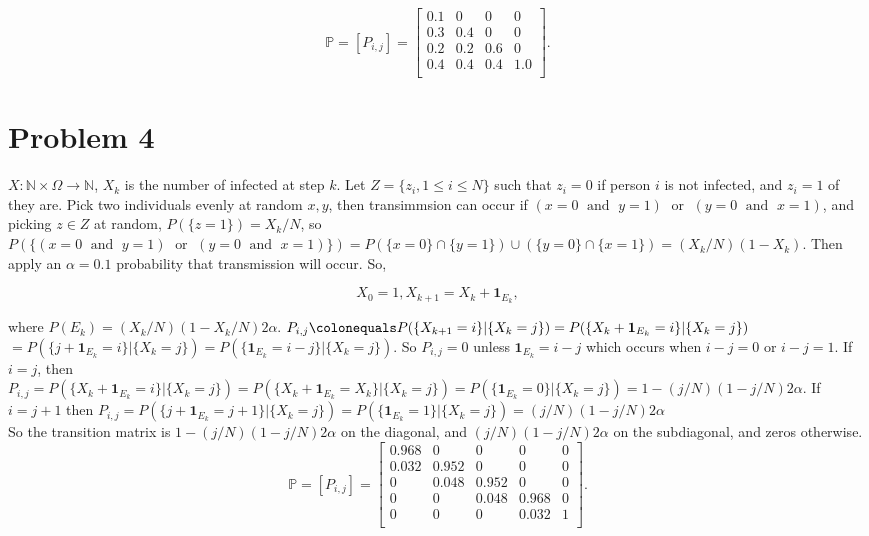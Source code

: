 \documentclass[12pt]{article}
\newcommand{\nats}[0] { \mathbb{N}}
\newcommand{\Om}[0] { \Omega }
\newcommand{\AND}[0]{ \; \textrm{ and } \;  }
\newcommand{\OR}[0]{ \; \textrm{ or } \; }
\newcommand{\rarw}[0] { \rightarrow }
\newcommand{ \defeq }[0] { \colonequals }
\newcommand{ \cf }[1] { \mathbf{1}_{#1} }
\begin{document}
$$
\mathbb{P} = [P_{i,j}] = \left[ \begin{array}{cccc} 
0.1  & 0  & 0 & 0 \\
0.3 & 0.4 & 0  & 0  \\
0.2 & 0.2 & 0.6 & 0 \\
0.4 & 0.4 & 0.4 & 1.0    \\
\end{array} \right].
$$



\section*{Problem 4}

$X: \nats \times \Om \rarw \nats$, $X_k$ is the number of infected at step $k$. Let $Z = \{ z_i, 1 \le i \le N \}$ such that $z_i = 0$ if person $i$ is not infected, and $z_i = 1$ of they are. Pick two individuals evenly at random $x, y$, then transimmsion can occur if $(x = 0 \AND y = 1 ) \OR ( y = 0 \AND x = 1)$, and picking $z \in Z$ at random, $P( \{ z = 1\} ) = X_k/N$, so $P(\{ (x = 0 \AND y = 1 ) \OR ( y = 0 \AND x = 1) \}) = P(  \{ x = 0 \} \cap \{ y = 1 \} ) \cup ( \{ y = 0  \} \cap \{ x = 1 \} )  = (X_k/N)(1-X_k)$. Then apply an $ \alpha = 0.1$ probability that transmission will occur. So,

$$
X_0 = 1, X_{k+1} = X_k + \cf{E_k} ,
$$

\noindent
where $P(E_k) =  (X_k/N) (1-X_k/N) 2 \alpha $. $P_{i,j} \defeq P( \{ X_{k+1} = i\} | \{ X_k = j \} ) = P( \{  X_k + \cf{E_k} = i\} | \{ X_k = j \} )$ $ = P( \{  j + \cf{E_k} = i\} | \{ X_k = j \} ) = P( \{  \cf{E_k} = i - j \} | \{ X_k = j \} )$.  So $P_{i,j} = 0$ unless $\cf{E_k} = i-j$ which occurs when $i-j = 0$ or $i-j = 1$.   If $i = j$, then $P_{i,j} = P( \{  X_k + \cf{E_k} = i\} | \{ X_k = j \} ) = P( \{  X_k + \cf{E_k} = X_k\} | \{ X_k = j \} ) =  P( \{ \cf{E_k} = 0\} | \{ X_k = j \} )  = 1- (j/N) (1-j/N) 2 \alpha $. If $i = j+1$ then $P_{i,j} =  P( \{  j + \cf{E_k} = j+1\} | \{ X_k = j \} ) = P( \{ \cf{E_k} = 1\} | \{ X_k = j \} ) = (j/N) (1-j/N) 2 \alpha $ \\

So the transition matrix is $1- (j/N) (1-j/N) 2 \alpha$ on the diagonal, and $ (j/N) (1-j/N) 2 \alpha$ on the subdiagonal, and zeros otherwise. \\


$$
\mathbb{P} = [P_{i,j}] = \left[ \begin{array}{ccccc} 
0.968  & 0  & 0 & 0 & 0 \\
0.032 & 0.952 & 0  & 0  & 0  \\
0 & 0.048 & 0.952 & 0 & 0  \\
0 & 0 & 0.048 & 0.968   & 0   \\
0 & 0 & 0 & 0.032  & 1    \\
\end{array} \right].
$$
\end{document}
